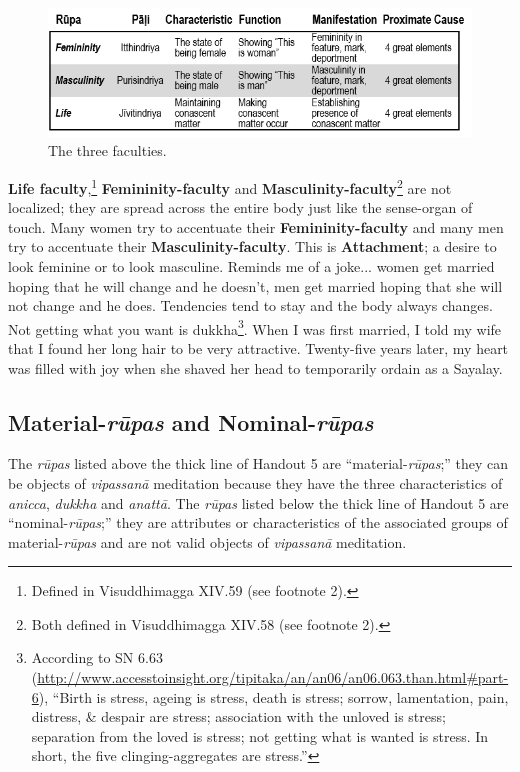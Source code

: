 \begin{figure}[h]
\centering
\includegraphics[width=0.8\linewidth]{./Diagrams/Faculties}
\caption{The three faculties.}
\label{fig:Faculties}
\end{figure}

\textbf{Life faculty},\footnote{Defined in Visuddhimagga XIV.59 (see footnote 2).} \textbf{Femininity-faculty} and \textbf{Masculinity-faculty}\footnote{Both defined in Visuddhimagga XIV.58 (see footnote 2).} are not localized; they are spread across the entire body just like the sense-organ of touch. Many women try to accentuate their \textbf{Femininity-faculty} and many men try to accentuate their \textbf{Masculinity-faculty}. This is \textbf{Attachment}; a desire to look feminine or to look masculine. Reminds me of a joke... women get married hoping that he will change and he doesn’t, men get married hoping that she will not change and he does. Tendencies tend to stay and the body always changes. Not getting what you want is dukkha\footnote{According to SN 6.63 (\url{http://www.accesstoinsight.org/tipitaka/an/an06/an06.063.than.html\#part-6}), “Birth is stress, ageing is stress, death is stress; sorrow, lamentation, pain, distress, \& despair are stress; association with the unloved is stress; separation from the loved is stress; not getting what is wanted is stress. In short, the five clinging-aggregates are stress.”}. When I was first married, I told my wife that I found her long hair to be very attractive. Twenty-five years later, my heart was filled with joy when she shaved her head to temporarily ordain as a Sayalay.

\subsection*{Material-\textit{rūpas} and Nominal-\textit{rūpas}}

The \textit{rūpas} listed above the thick line of Handout 5 are “material-\textit{rūpas};” they can be objects of \textit{vipassanā} meditation because they have the three characteristics of \textit{anicca}, \textit{dukkha} and \textit{anattā}. The \textit{rūpas} listed below the thick line of Handout 5 are “nominal-\textit{rūpas};” they are attributes or characteristics of the associated groups of material-\textit{rūpas} and are not valid objects of \textit{vipassanā} meditation.

